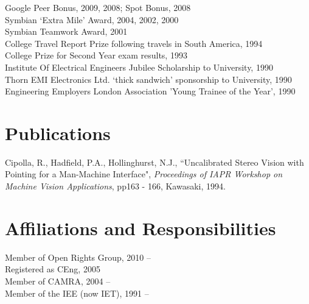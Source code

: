 \documentclass[margin,line]{resume}
\begin{document}
\begin{resume}
    Google Peer Bonus, 2009, 2008;  Spot Bonus, 2008              \vspace{0.5mm}\\%
    Symbian `Extra Mile' Award, 2004, 2002, 2000              \vspace{0.5mm}\\%
    Symbian Teamwork Award, 2001              \vspace{0.5mm}\\%
    College Travel Report Prize following travels in South America, 1994              \vspace{0.5mm}\\%
    College Prize for Second Year exam results, 1993              \vspace{0.5mm}\\%
    Institute Of Electrical Engineers Jubilee Scholarship to University, 1990              \vspace{0.5mm}\\%
    Thorn EMI Electronics Ltd. `thick sandwich' sponsorship to University, 1990              \vspace{0.5mm}\\%
    Engineering Employers London Association 'Young Trainee of the Year', 1990


    \section{\mysidestyle Publications}

    Cipolla, R., Hadfield, P.A., Hollinghurst, N.J.,
    ``Uncalibrated Stereo Vision with Pointing for a Man-Machine Interface",
    \textsl{Proceedings of IAPR Workshop on Machine Vision Applications}, pp163 - 166, Kawasaki, 1994.
    

    \section{\mysidestyle Affiliations and Responsibilities}

    Member of Open Rights Group, 2010 --             \vspace{0.5mm}\\%
    Registered as CEng, 2005              \vspace{0.5mm}\\%
    Member of CAMRA, 2004 --             \vspace{0.5mm}\\%
    Member of the IEE (now IET), 1991 --



\end{resume}
\end{document}
